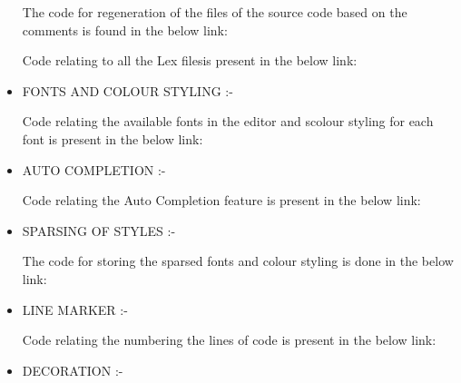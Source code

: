 \begin{itemize}
\begin{center}
The code for regeneration of the files of the source code based on the comments is
found in the below link:  
\end{center}
\begin{center}
Code relating to all the Lex filesis present in the below link:  
\end{center}
\item FONTS AND COLOUR STYLING :- \newline
\begin{center}
Code relating the available fonts in the editor and scolour styling for each font is
present in the below link:  
\end{center}
\item AUTO COMPLETION :-   \newline
\begin{center}
Code relating the Auto Completion feature is present in the below link:  
\end{center}
\item SPARSING OF STYLES :-  \newline 
\begin{center}
The code for storing the sparsed fonts and colour styling is done in the below link:  
\end{center}
\item LINE MARKER :- \newline  
\begin{center}
Code relating the numbering the lines of code is present in the below link: 
\end{center}
\item DECORATION :-  \newline 

\end{itemize}
